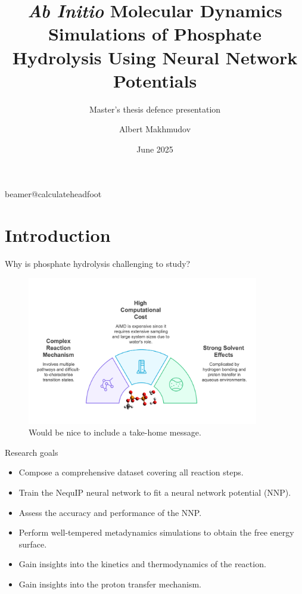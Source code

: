 \documentclass[11pt,t]{beamer}
\title[`AIMD' Simulations of Phosphate Hydrolysis Using NNPs]{\textit{Ab Initio} Molecular Dynamics Simulations of Phosphate Hydrolysis Using Neural Network Potentials} %
\subtitle{Master's thesis defence presentation}
\author{Albert Makhmudov}
\institute{Supervisor: Prof. J. Harvey}
\date{June 2025}
\begin{document}
\csname beamer@calculateheadfoot\endcsname %


\begin{frame}
	\titlepage
\end{frame}



\section{Introduction}
\begin{frame}{Why is phosphate hydrolysis challenging to study?}
	\vspace{-30pt}
	\begin{figure}
		\centering
		\includegraphics[width=0.9\textwidth]{Figures/introduction_background.png}
		\small
		\flushleft
		Would be nice to include a take-home message.
	\end{figure}
\end{frame}



\begin{frame}{Research goals}
	\small
	\begin{itemize}
		\item Compose a comprehensive dataset covering all reaction steps.
		\item Train the NequIP neural network to fit a neural network potential (NNP).
		\item Assess the accuracy and performance of the NNP.
		\item Perform well-tempered metadynamics simulations to obtain the free energy surface.
		\item Gain insights into the kinetics and thermodynamics of the reaction.
		\item Gain insights into the proton transfer mechanism.
	\end{itemize}	
\end{frame}
\end{document}
